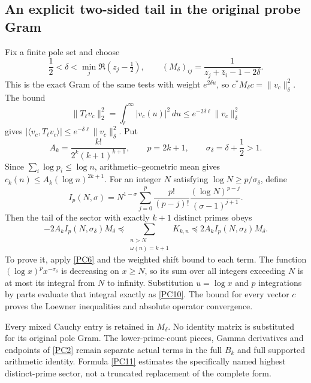 \documentclass[11pt,a4paper]{article}
\theoremstyle{definition}\newtheorem{definition}[theorem]{Definition}
\begin{document}
\subsection{An explicit two-sided tail in the original probe Gram}
Fix a finite pole set and choose
\begin{equation}
 \frac12<\delta<\min_j\Re(z_j-\tfrac12),\qquad
 (M_\delta)_{ij}=\frac1{z_j+\bar z_i-1-2\delta}.             \tag{PC8}\label{PC8}
\end{equation}
This is the exact Gram of the same tests with weight $e^{2\delta u}$, so $c^*M_\delta c=\|v_c\|_\delta^2$. The bound
\[
 \|T_\ell v_c\|_2^2
 =\int_\ell^\infty|v_c(u)|^2\,du
 \le e^{-2\delta\ell}\|v_c\|_\delta^2
\]
gives
$|\langle v_c,T_\ell v_c\rangle|\le e^{-\delta\ell}\|v_c\|_\delta^2$.
Put
\begin{equation}
 A_k=\frac{k!}{2^k(k+1)^{k+1}},\qquad p=2k+1,\qquad
 \sigma_\delta=\delta+\frac12>1.                              \tag{PC9}\label{PC9}
\end{equation}
Since $\sum_i\log p_i\le\log n$, arithmetic--geometric mean gives
$c_k(n)\le A_k(\log n)^{2k+1}$.
For an integer $N$ satisfying $\log N\ge p/\sigma_\delta$, define
\begin{equation}
 I_p(N,\sigma)=N^{1-\sigma}
  \sum_{j=0}^p\frac{p!}{(p-j)!}
             \frac{(\log N)^{p-j}}{(\sigma-1)^{j+1}}.
                                                               \tag{PC10}\label{PC10}
\end{equation}
Then the tail of the sector with exactly $k+1$ distinct primes obeys
\begin{equation}
 \boxed{-2A_kI_p(N,\sigma_\delta)M_\delta
 \preceq\sum_{\substack{n>N\\\omega(n)=k+1}}K_{k,n}
 \preceq2A_kI_p(N,\sigma_\delta)M_\delta.}                    \tag{PC11}\label{PC11}
\end{equation}
To prove it, apply \eqref{PC6} and the weighted shift bound to each term. The function $(\log x)^px^{-\sigma_\delta}$ is decreasing on $x\ge N$, so its sum over all integers exceeding $N$ is at most its integral from $N$ to infinity. Substitution $u=\log x$ and $p$ integrations by parts evaluate that integral exactly as \eqref{PC10}. The bound for every vector $c$ proves the Loewner inequalities and absolute operator convergence.

Every mixed Cauchy entry is retained in $M_\delta$. No identity matrix is substituted for its original pole Gram. The lower-prime-count pieces, Gamma derivatives and endpoints of \eqref{PC2} remain separate actual terms in the full $B_k$ and full supported arithmetic identity. Formula \eqref{PC11} estimates the specifically named highest distinct-prime sector, not a truncated replacement of the complete form.
\end{document}
